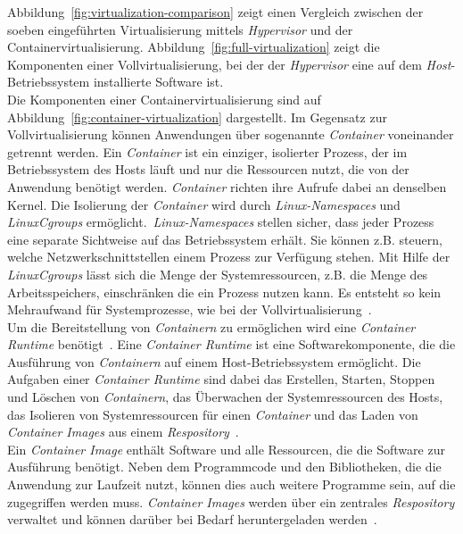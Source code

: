 Abbildung~\ref{fig:virtualization-comparison} zeigt einen Vergleich zwischen der soeben eingeführten Virtualisierung mittels \textit{Hypervisor} und
der Containervirtualisierung.
Abbildung~\ref{fig:full-virtualization} zeigt die Komponenten einer Vollvirtualisierung, bei der der \textit{Hypervisor}
eine auf dem \textit{Host}-Betriebssystem installierte Software ist.
\\
Die Komponenten einer Containervirtualisierung sind auf Abbildung~\ref{fig:container-virtualization} dargestellt.
Im Gegensatz zur Vollvirtualisierung können Anwendungen über sogenannte \textit{Container} voneinander getrennt werden.
Ein \textit{Container} ist ein einziger, isolierter Prozess, der im Betriebssystem des Hosts läuft und nur die Ressourcen nutzt, die von der Anwendung benötigt werden.
\textit{Container} richten ihre Aufrufe dabei an denselben Kernel. Die Isolierung der \textit{Container} wird durch \textit{Linux-Namespaces} und
\textit{LinuxCgroups} ermöglicht.~\textit{Linux-Namespaces} stellen sicher, dass jeder Prozess eine separate Sichtweise auf das Betriebssystem erhält.
Sie können z.B. steuern, welche Netzwerkschnittstellen einem Prozess zur Verfügung stehen. Mit Hilfe der \textit{LinuxCgroups} lässt sich die Menge
der Systemressourcen, z.B. die Menge des Arbeitsspeichers, einschränken die ein Prozess nutzen kann.
Es entsteht so kein Mehraufwand für Systemprozesse, wie bei der Vollvirtualisierung~\cite{kubernetes-in-action-introduction}.
\\
Um die Bereitstellung von \textit{Containern} zu ermöglichen wird eine \textit{Container Runtime} benötigt~\cite{kubernetes-overview}.
Eine \textit{Container Runtime} ist eine Softwarekomponente, die die Ausführung von \textit{Containern} auf einem Host-Betriebssystem ermöglicht.
Die Aufgaben einer \textit{Container Runtime} sind dabei das Erstellen, Starten, Stoppen und Löschen von \textit{Containern},
das Überwachen der Systemressourcen des Hosts, das Isolieren von Systemressourcen für einen \textit{Container}
und das Laden von \textit{Container Images} aus einem \textit{Respository}~\cite{container-runtime-aquasec}.
\\
Ein \textit{Container Image} enthält Software und alle Ressourcen, die die Software zur Ausführung benötigt.
Neben dem Programmcode und den Bibliotheken, die die Anwendung zur Laufzeit nutzt, können dies auch weitere Programme sein, auf die zugegriffen werden muss.
\textit{Container Images} werden über ein zentrales \textit{Respository} verwaltet und können darüber bei Bedarf heruntergeladen werden~\cite{container-image-dev-insider}.

